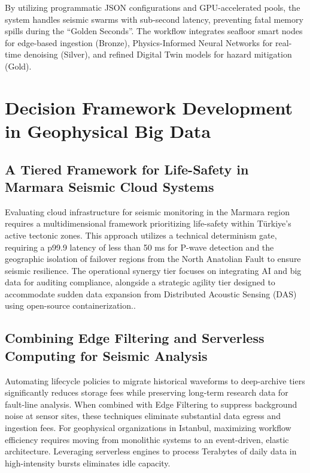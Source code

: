 \documentclass[data,article,accept,pdftex,moreauthors]{Definitions/mdpi}
\begin{document}
By utilizing programmatic JSON configurations and GPU-accelerated pools, the system handles seismic swarms with sub-second latency, preventing fatal memory spills during the ``Golden Seconds''. The workflow integrates seafloor smart nodes for edge-based ingestion (Bronze), Physics-Informed Neural Networks for real-time denoising (Silver), and refined Digital Twin models for hazard mitigation (Gold).

\section{Decision Framework Development in Geophysical Big Data}

\subsection{A Tiered Framework for Life-Safety in Marmara Seismic Cloud Systems}

Evaluating cloud infrastructure for seismic monitoring in the Marmara region requires a multidimensional framework prioritizing life-safety within Türkiye's active tectonic zones. This approach utilizes a technical determinism gate, requiring a p99.9 latency of less than 50 ms for P-wave detection and the geographic isolation of failover regions from the North Anatolian Fault to ensure seismic resilience. The operational synergy tier focuses on integrating AI and big data for auditing compliance, alongside a strategic agility tier designed to accommodate sudden data expansion from Distributed Acoustic Sensing (DAS) using open-source containerization..

\subsection{Combining Edge Filtering and Serverless Computing for Seismic Analysis}

Automating lifecycle policies to migrate historical waveforms to deep-archive tiers significantly reduces storage fees while preserving long-term research data for fault-line analysis. When combined with Edge Filtering to suppress background noise at sensor sites, these techniques eliminate substantial data egress and ingestion fees. For geophysical organizations in Istanbul, maximizing workflow efficiency requires moving from monolithic systems to an event-driven, elastic architecture. Leveraging serverless engines to process Terabytes of daily data in high-intensity bursts eliminates idle capacity. 
\end{document}
